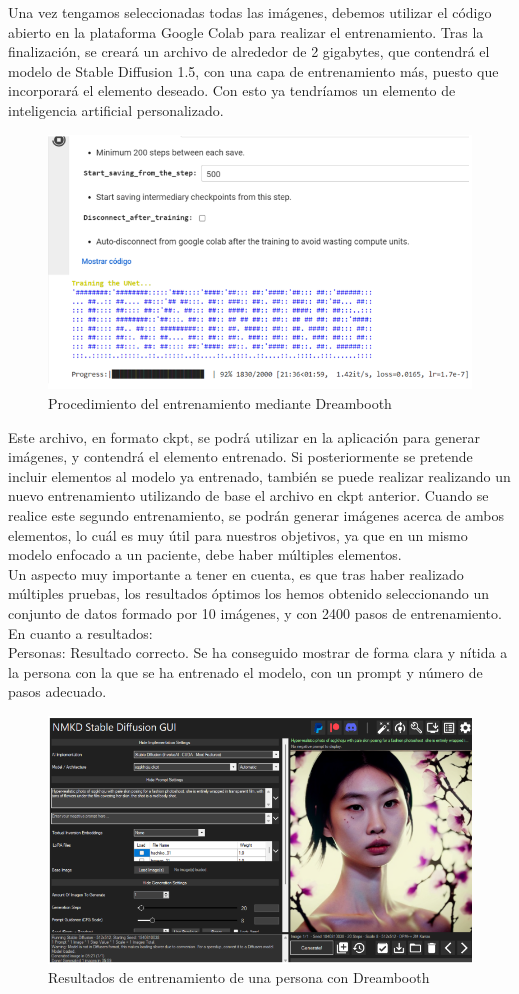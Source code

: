 Una vez tengamos seleccionadas todas las imágenes, debemos utilizar el código abierto en la plataforma Google Colab para realizar el entrenamiento. Tras la finalización, se creará un archivo de alrededor de 2 gigabytes, que contendrá el modelo de Stable Diffusion 1.5, con una capa de entrenamiento más, puesto que incorporará el elemento deseado. Con esto ya tendríamos un elemento de inteligencia artificial personalizado.\\
\begin{figure}[h]
	\centering
	\includegraphics[width = 0.4
	\textwidth]{Imagenes/Vectorial/dreambooth.png}
	\caption{Procedimiento del entrenamiento mediante Dreambooth}
	\label{fig:sampleImage}
\end{figure}


Este archivo, en formato ckpt, se podrá utilizar en la aplicación para generar imágenes, y contendrá el elemento entrenado. Si posteriormente se pretende incluir elementos al modelo ya entrenado, también se puede realizar realizando un nuevo entrenamiento utilizando de base el archivo en ckpt anterior. Cuando se realice este segundo entrenamiento, se podrán generar imágenes acerca de ambos elementos, lo cuál es muy útil para nuestros objetivos, ya que en un mismo modelo enfocado a un paciente, debe haber múltiples elementos.\\

Un aspecto muy importante a tener en cuenta, es que tras haber realizado múltiples pruebas, los resultados óptimos los hemos obtenido seleccionando un conjunto de datos formado por 10 imágenes, y con 2400 pasos de entrenamiento.\\

En cuanto a resultados:\\
Personas: Resultado correcto. Se ha conseguido mostrar de forma clara y nítida a la persona con la que se ha entrenado el modelo, con un prompt y número de pasos adecuado.\\
\begin{figure}[h]
	\centering
	\includegraphics[width = 0.5
	\textwidth]{Imagenes/Vectorial/hoyeon1.png}
	\caption{Resultados de entrenamiento de una persona con Dreambooth}
	\label{fig:sampleImage}
\end{figure}

